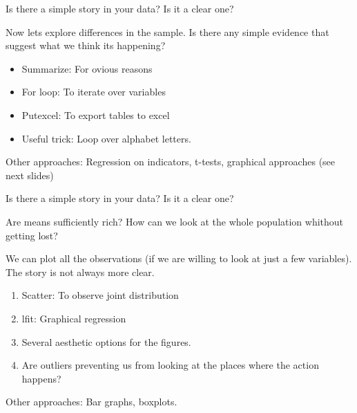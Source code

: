 \documentclass[10pt]{beamer}
\begin{document}
\begin{frame}{Is there a simple story in your data? Is it a clear one?}

    Now lets explore differences in the sample. Is there any simple evidence that suggest what we think its happening? \\
    \bigskip
    \begin{itemize}
            \item Summarize: For ovious reasons
            \item For loop: To iterate over variables
            \item Putexcel: To export tables to excel
            \item Useful trick: Loop over alphabet letters.
    \end{itemize}
    \bigskip
    Other approaches: Regression on indicators, t-tests, graphical approaches (see next slides) 
    
\end{frame}

\begin{frame}{Is there a simple story in your data? Is it a clear one?}

    \begin{adjustbox}{width=.9\textwidth}
    
    \end{adjustbox}
    
\end{frame}

\begin{frame}{Are means sufficiently rich? How can we look at the whole population whithout getting lost?}

    We can plot all the observations (if we are willing to look at just a few variables). The story is not always more clear.\\
    \bigskip
    \begin{enumerate}
        \item Scatter: To observe joint distribution
        \item lfit: Graphical regression
        \item Several aesthetic options for the figures.
        \item Are outliers preventing us from looking at the places where the action happens?
    \end{enumerate}
    
    Other approaches: Bar graphs, boxplots. 
    
\end{frame}
\end{document}
